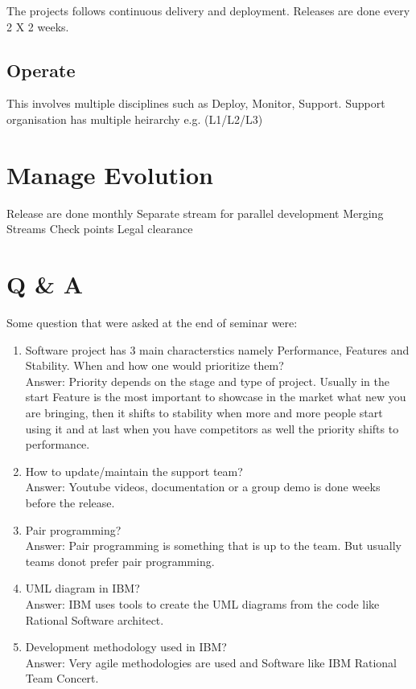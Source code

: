 \documentclass[10pt]{article}
\begin{document}
The projects follows continuous delivery and deployment. Releases are done every 2 X 2 weeks.

\subsection{Operate}

This involves multiple disciplines such as Deploy, Monitor, Support. Support organisation has multiple heirarchy e.g. (L1/L2/L3)

\section{Manage Evolution}

Release are done monthly
Separate stream for parallel development
Merging Streams
Check points
Legal clearance

\section{Q \& A}

Some question that were asked at the end of seminar were:

\begin{enumerate}
    \item Software project has 3 main characterstics namely Performance, Features and Stability. When and how one would prioritize them? \\
    Answer: Priority depends on the stage and type of project. Usually in the start Feature is the most important to showcase in the market what new you are bringing, then it shifts to stability when more and more people start using it and at last when you have competitors as well the priority shifts to performance.
    \item How to update/maintain the support team? \\
    Answer: Youtube videos, documentation or a group demo is done weeks before the release.
    \item Pair programming? \\
    Answer: Pair programming is something that is up to the team. But usually teams donot prefer pair programming.
    \item UML diagram in IBM? \\
    Answer: IBM uses tools to create the UML diagrams from the code like Rational Software architect.
    \item Development methodology used in IBM? \\
    Answer: Very agile methodologies are used and Software like IBM Rational Team Concert.

\end{enumerate}
\end{document}
